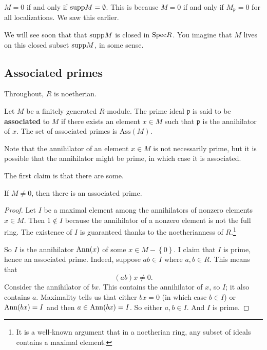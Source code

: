 \begin{remark} 
$M = 0$ if and only if $\mathrm{supp} M = \emptyset$. This is because $M= 0$ if and
only if $M_{\mathfrak{p}} = 0$ for all localizations.  We saw this earlier.
\end{remark} 

We will see soon that that $\mathrm{supp} M$ is closed in $\mathrm{Spec} R$. You imagine that
$M$ lives on this closed subset $\mathrm{supp} M$, in some sense.


\newcommand{\ass}{\mathrm{Ass}}

\subsection{Associated primes}
Throughout, $R$ is noetherian.

\begin{definition} 
Let $M$ be a finitely generated $R$-module.  The prime ideal $\mathfrak{p}$ is said to be
\textbf{associated} to $M$ if there exists an element $x \in M$ such that
$\mathfrak{p}$ is the annihilator of $x$.  The set of associated primes is
$\ass(M)$.
\end{definition} 

Note that the annihilator of an element $x \in M$ is not necessarily prime, but
it is possible that the annihilator might be prime, in which case it is
associated.

The first claim is that there are some.
\begin{proposition} 
If $M \neq 0$, then there is an associated prime.
\end{proposition} 
\begin{proof} 
Let $I$ be a maximal element among the annihilators of nonzero elements $x \in M$. 
Then $1 \notin I$ because the annihilator of a nonzero element is not the full
ring. The existence of $I$ is guaranteed thanks to the noetherianness of
$R$.\footnote{It is a well-known argument that in a noetherian ring, any subset
of ideals contains a maximal element.}

So $I$ is the annihilator $\mathrm{Ann}(x)$ of some $x \in M - \left\{0\right\}$. I claim that
$I$ is prime, hence an associated prime.  
Indeed, suppose $ab \in I$ where $a,b \in R$. This means that
\[ (ab)x \neq 0.  \]
Consider the annihilator of $bx$. This contains the annihilator of $x$, so $I$;
it also contains $a$. Maximality tells us that either $bx = 0$ (in which case
$b \in I$) or $\mathrm{Ann}(bx) = I$ and  then $a \in \mathrm{Ann}(bx) = I$. So either $a,b \in I$.
And $I$ is prime. 
\end{proof} 


